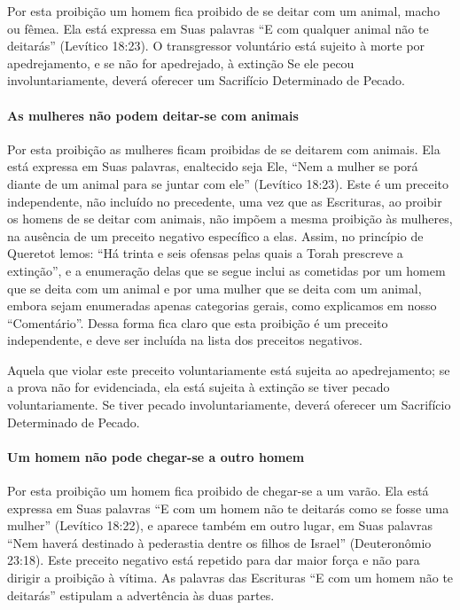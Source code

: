 Por esta proibição um homem fica proibido de se deitar com um animal,
macho ou fêmea. Ela está expressa em Suas palavras ``E com qualquer
animal não te deitarás'' (Levítico 18:23). O transgressor voluntário
está sujeito à morte por apedrejamento, e se não for apedrejado, à
extinção Se ele pecou involuntariamente, deverá oferecer um Sacrifício
Determinado de Pecado.

\paragraph{As mulheres não podem deitar-se com animais}

Por esta proibição as mulheres ficam proibidas de se deitarem com
animais. Ela está expressa em Suas palavras, enaltecido seja Ele, ``Nem
a mulher se porá diante de um animal para se juntar com ele'' (Levítico
18:23). Este é um preceito independente, não incluído no precedente, uma
vez que as Escrituras, ao proibir os homens de se deitar com animais,
não impõem a mesma proibição às mulheres, na ausência de um preceito
negativo específico a elas. Assim, no princípio de Queretot lemos: ``Há
trinta e seis ofensas pelas quais a Torah prescreve a extinção'', e a
enumeração delas que se segue inclui as cometidas por um homem que se
deita com um animal e por uma mulher que se deita com um animal, embora
sejam enumeradas apenas categorias gerais, como explicamos em nosso
``Comentário''. Dessa forma fica claro que esta proibição é um preceito
independente, e deve ser incluída na lista dos preceitos negativos.

Aquela que violar este preceito voluntariamente está sujeita ao
apedrejamento; se a prova não for evidenciada, ela está sujeita à
extinção se tiver pecado voluntariamente. Se tiver pecado
involuntariamente, deverá oferecer um Sacrifício Determinado de Pecado.

\paragraph{Um homem não pode chegar-se a outro homem}

Por esta proibição um homem fica proibido de chegar-se a um varão. Ela
está expressa em Suas palavras ``E com um homem não te deitarás como se
fosse uma mulher'' (Levítico 18:22), e aparece também em outro lugar, em
Suas palavras ``Nem haverá destinado à pederastia dentre os filhos de
Israel'' (Deuteronômio 23:18). Este preceito negativo está repetido
para dar maior força e não para dirigir a proibição à vítima. As
palavras das Escrituras ``E com um homem não te deitarás'' estipulam a
advertência às duas partes.

